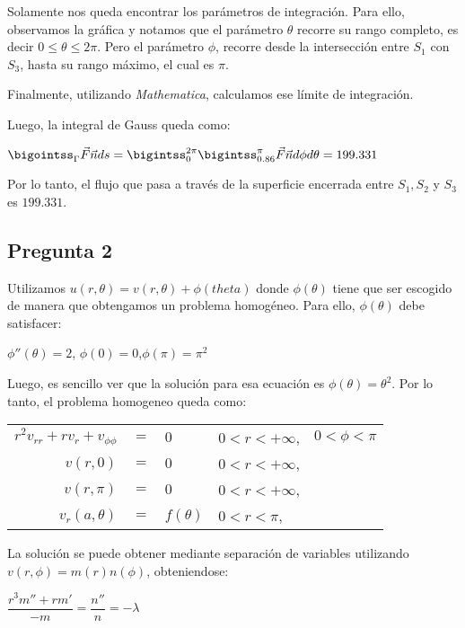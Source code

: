 \documentclass[11pt,letterpaper]{article}
\begin{document}
Solamente nos queda encontrar los parámetros de integración. Para ello, observamos la gráfica y notamos que el parámetro $\theta$ recorre su rango completo, es decir $0\leq \theta \leq 2\pi$. Pero el parámetro $\phi$, recorre desde la intersección entre $S_1$ con $S_3$, hasta su rango máximo, el cual es $\pi$.

Finalmente, utilizando \textit{Mathematica}, calculamos ese límite de integración.

Luego, la integral de Gauss queda como:

\begin{center}
$\bigointss_\Gamma \vec{F}\vec{n}ds=\bigintss_0^{2\pi}\bigintss_{0.86}^\pi \vec{F}\vec{n}d\phi d\theta = 199.331$\end{center}

Por lo tanto, el flujo que pasa a través de la superficie encerrada entre $S_1,S_2$ y $S_3$ es $199.331$.
\subsection{Pregunta 2}
Utilizamos $u(r,\theta) = v(r,\theta)+\phi(theta)$ donde $\phi(\theta)$ tiene que ser escogido de manera que obtengamos un problema homogéneo. Para ello, $\phi(\theta)$ debe satisfacer:

\begin{center}$\phi''(\theta)=2$,    $\phi(0)=0$,$\phi(\pi)=\pi^2$\end{center}

Luego, es sencillo ver que la solución para esa ecuación es $\phi(\theta)=\theta^2$. Por lo tanto, el problema homogeneo queda como:
\begin{center}
\begin{tabular}{r c l l l}
$r^2v_{rr}+rv_r+v_{\phi\phi}$ & $=$ & $0$ & $0 < r < +\infty$, &  $0 < \phi < \pi$ \\
$v(r,0)$ & $=$ & $0$ & $0 < r < +\infty$, & \\
$v(r,\pi)$ & $=$ & $0$ & $0 < r < +\infty$, &  \\
$v_r(a,\theta)$ & $=$ & $f(\theta)$ & $0 < r < \pi$, &   \\
\end{tabular}
\end{center}

La solución se puede obtener mediante separación de variables utilizando $v(r,\phi)=m(r)n(\phi)$, obteniendose:

\begin{center}
$\dfrac{r^3m''+rm'}{-m}=\dfrac{n''}{n}=-\lambda$
\end{center}
\end{document}
